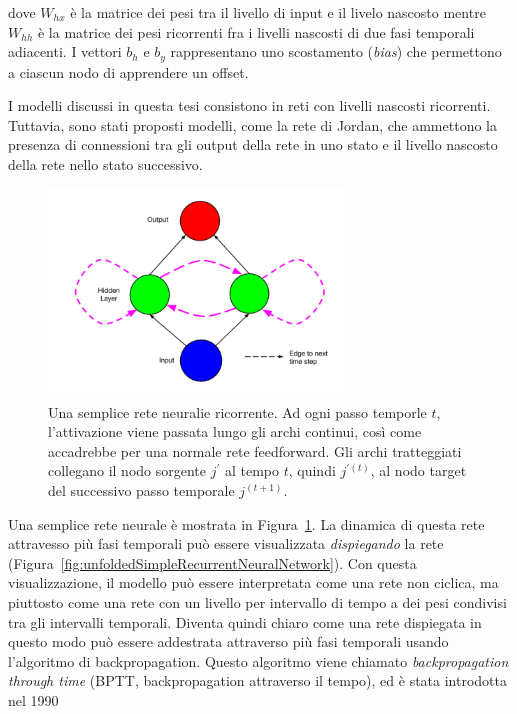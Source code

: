 dove $W_{hx}$ \`e la matrice dei pesi tra il livello di input e il livelo nascosto mentre $W_{hh}$ \`e la matrice dei pesi ricorrenti fra i livelli nascosti di due fasi temporali adiacenti.
I vettori $b_h$ e $b_y$ rappresentano uno scostamento (\emph{bias}) che permettono a ciascun nodo di apprendere un offset.

I modelli discussi in questa tesi consistono in reti con livelli nascosti ricorrenti.
Tuttavia, sono stati proposti modelli, come la rete di Jordan, che ammettono la presenza di connessioni tra gli output della rete in uno stato e il livello nascosto della rete nello stato successivo.

\begin{figure}[tp]
  \centering
  \begin{center}
    \includegraphics[width=0.7\textwidth]{./images/simpleRecurrentNeuralNetwork.png}
  \end{center}
  \caption{Una semplice rete neuralie ricorrente.
  Ad ogni passo temporle $t$, l'attivazione viene passata lungo gli archi continui, cos\`i come accadrebbe per una normale rete feedforward.
  Gli archi tratteggiati collegano il nodo sorgente $j^{'}$ al tempo $t$, quindi $j^{'(t)}$, al nodo target del successivo passo temporale $j^{(t+1)}$.}
  \label{fig:simpleRecurrentNeuralNetwork}
\end{figure}

Una semplice rete neurale \`e mostrata in Figura~\ref{fig:simpleRecurrentNeuralNetwork}.
La dinamica di questa rete attravesso pi\`u fasi temporali pu\`o essere visualizzata \emph{dispiegando} la rete (Figura~\ref{fig:unfoldedSimpleRecurrentNeuralNetwork}).
Con questa visualizzazione, il modello pu\`o essere interpretata come una rete non ciclica, ma piuttosto come una rete con un livello per intervallo di tempo a dei pesi condivisi tra gli intervalli temporali.
Diventa quindi chiaro come una rete dispiegata in questo modo pu\`o essere addestrata attraverso pi\`u fasi temporali usando l'algoritmo di backpropagation.
Questo algoritmo viene chiamato \emph{backpropagation through time} (BPTT, backpropagation attraverso il tempo), ed \`e stata introdotta nel 1990~\cite{Werbos:1990}

